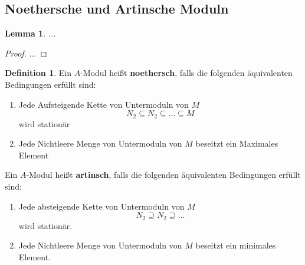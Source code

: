 \documentclass[10pt,a4paper]{article}
\newcounter{thm}[section]
\theoremstyle{definition}
\newtheorem{definition}[thm]{Definition}
\theoremstyle{plain}
\newtheorem{lem}[thm]{Lemma}
\theoremstyle{remark}
\begin{document}
\subsection{Noethersche und Artinsche Moduln}
\begin{lem}\label{501lem}
	...%
\end{lem}
\begin{proof}
	... %
\end{proof}
\begin{definition}
	Ein $A$-Modul heißt \textbf{noethersch}, falls die folgenden äquivalenten Bedingungen erfüllt sind:
	\begin{enumerate}
		\item Jede Aufsteigende Kette von Untermoduln von $M$
		\[N_2\subseteq N_2\subseteq...\subseteq M\]
		wird stationär
		\item Jede Nichtleere Menge von Untermoduln von $M$ beseitzt ein Maximales Element
	\end{enumerate}
	Ein $A$-Modul heißt \textbf{artinsch}, falls die folgenden äquivalenten Bedingungen erfüllt sind:
	\begin{enumerate}
		\item Jede absteigende Kette von Untermoduln von $M$
		\[N_2\supseteq N_2\supseteq...\]
		wird stationär.
		\item Jede Nichtleere Menge von Untermoduln von $M$ beseitzt ein minimales Element.
	\end{enumerate}
\end{definition}

\addtocounter{thm}{-1}
\end{document}
